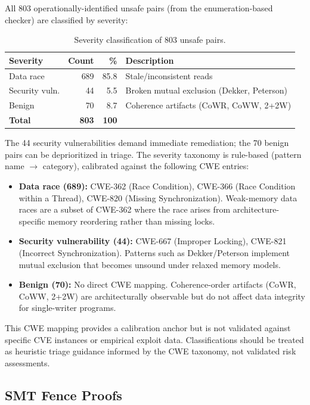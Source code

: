 \documentclass[11pt]{article}
\begin{document}
All 803 operationally-identified unsafe pairs (from the enumeration-based checker)
are classified by severity:

\begin{table}[ht]
\centering
\caption{Severity classification of 803 unsafe pairs.}
\label{tab:severity}
\small
\begin{tabular}{lrrl}
\toprule
\textbf{Severity} & \textbf{Count} & \textbf{\%} & \textbf{Description} \\
\midrule
Data race          & 689 & 85.8 & Stale/inconsistent reads \\
Security vuln.     & 44  & 5.5 & Broken mutual exclusion (Dekker, Peterson) \\
Benign             & 70 & 8.7 & Coherence artifacts (CoWR, CoWW, 2+2W) \\
\midrule
\textbf{Total}     & \textbf{803} & \textbf{100} & \\
\bottomrule
\end{tabular}
\end{table}

\noindent
The 44 security vulnerabilities demand immediate remediation; the
70 benign pairs can be deprioritized in triage.
The severity taxonomy is rule-based (pattern name $\to$ category),
calibrated against the following CWE entries:
\begin{itemize}[nosep]
\item \textbf{Data race (689):} CWE-362 (Race Condition), CWE-366
  (Race Condition within a Thread), CWE-820 (Missing Synchronization).
  Weak-memory data races are a subset of CWE-362 where the race arises
  from architecture-specific memory reordering rather than missing locks.
\item \textbf{Security vulnerability (44):} CWE-667 (Improper Locking),
  CWE-821 (Incorrect Synchronization). Patterns such as Dekker/Peterson
  implement mutual exclusion that becomes unsound under relaxed memory
  models.
\item \textbf{Benign (70):} No direct CWE mapping. Coherence-order
  artifacts (CoWR, CoWW, 2+2W) are architecturally observable but do
  not affect data integrity for single-writer programs.
\end{itemize}
\noindent
This CWE mapping provides a calibration anchor but is not validated
against specific CVE instances or empirical exploit data.
Classifications should be treated as heuristic triage guidance informed
by the CWE taxonomy, not validated risk assessments.

\subsection{SMT Fence Proofs}
\label{sec:fence-proofs}
\end{document}

